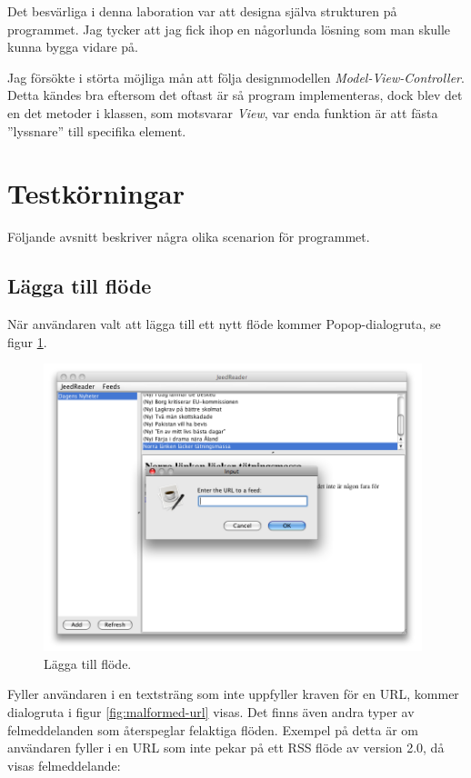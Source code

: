 \documentclass[titlepage, twoside, a4paper, 12pt]{article}
\begin{document}
Det besvärliga i denna laboration var att designa själva strukturen på
programmet. Jag tycker att jag fick ihop en någorlunda lösning som man
skulle kunna bygga vidare på.

Jag försökte i störta möjliga mån att följa designmodellen
\textit{Model-View-Controller}. Detta kändes bra eftersom det oftast
är så program implementeras, dock blev det en det metoder i klassen,
som motsvarar \textit{View}, var enda funktion är att fästa
''lyssnare'' till specifika element.

\section{Testkörningar}\label{Testkorningar}

Följande avsnitt beskriver några olika scenarion för programmet.

\subsection{Lägga till flöde}
När användaren valt att lägga till ett nytt flöde kommer
Popop-dialogruta, se figur \ref{fig:add-feed}.

\begin{figure}[!hbp]
  \begin{center}
    \includegraphics[width=110mm]{images/add-feed.png}
    \caption{Lägga till flöde.}
    \label{fig:add-feed}
  \end{center}
\end{figure}

Fyller användaren i en textsträng som inte uppfyller kraven för en
URL, kommer dialogruta i figur \ref{fig:malformed-url} visas. Det
finns även andra typer av felmeddelanden som återspeglar felaktiga
flöden. Exempel på detta är om användaren fyller i en URL som inte
pekar på ett RSS flöde av version 2.0, då visas felmeddelande:
\end{document}
